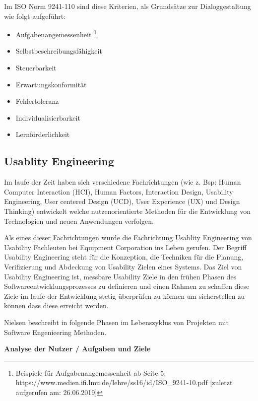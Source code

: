 Im ISO Norm  9241-110 sind diese Kriterien, als Grundsätze zur Dialoggestaltung wie folgt aufgeführt:

\begin{itemize}
	\item Aufgabenangemessenheit \footnote{Beispiele für Aufgabenangemessenheit ab Seite 5: https://www.medien.ifi.lmu.de/lehre/ss16/id/ISO\_9241-10.pdf [zuletzt aufgerufen am: 26.06.2019]}
	\item Selbstbeschreibungsfähigkeit
	\item Steuerbarkeit
	\item Erwartungskonformität
	\item Fehlertoleranz
	\item Individualisierbarkeit
	\item Lernförderlichkeit
\end{itemize}

\subsection{Usablity Engineering}

\cite{MichaelRichter2016} Im laufe der Zeit haben sich verschiedene Fachrichtungen (wie z. Bsp: Human Computer Interaction (HCI), Human Factors, Interaction Design, Usability Engineering, 
User centered Design (UCD), User Experience (UX) und Design Thinking) entwickelt welche nutzenorientierte Methoden für die Entwicklung von Technologien und neuen Anwendungen verfolgen. 

\cite{MaryBethRossonJohnM.CarrollDianeD.Cerra2002} Als eines dieser Fachrichtungen wurde die Fachrichtung Usablity Engineering von Usability Fachleuten bei Equipment Corporation ins Leben gerufen.  
Der Begriff Usability Engineering steht für die Konzeption, die Techniken für die Planung, Verifizierung und Abdeckung von Usability Zielen eines Systems. Das Ziel von Usability Engineering ist, 
messbare Usability Ziele in den frühen Phasen des Softwareentwicklungsprozesses zu definieren und einen Rahmen zu schaffen diese Ziele im laufe der Entwicklung stetig überprüfen zu können 
um sicherstellen zu können dass diese erreicht werden.

Nielsen beschreibt in \cite{Nielsen1994} folgende Phasen im Lebenszyklus von Projekten mit Software Engenieering Methoden.

\vspace{5mm}
\textbf{Analyse der Nutzer / Aufgaben und Ziele}  
 
